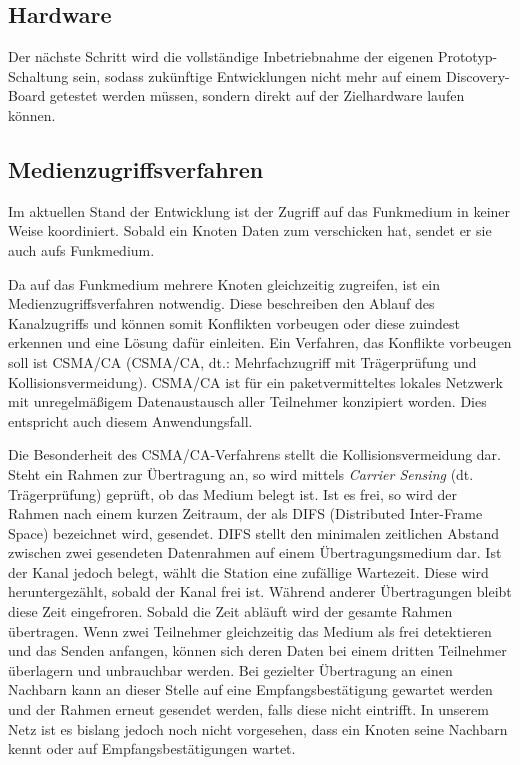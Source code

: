 \documentclass{IEEEtran}
\begin{document}
    \subsection{Hardware}
        Der nächste Schritt wird die vollständige Inbetriebnahme der eigenen
        Prototyp-Schaltung sein, sodass zukünftige Entwicklungen nicht mehr
        auf einem Discovery-Board getestet werden müssen, sondern direkt auf
        der Zielhardware laufen können.

    \subsection{Medienzugriffsverfahren}
    Im aktuellen Stand der Entwicklung ist der Zugriff auf das Funkmedium in 
    keiner Weise koordiniert. Sobald ein Knoten Daten zum verschicken hat, 
    sendet er sie auch aufs Funkmedium. 

    Da auf das Funkmedium mehrere Knoten gleichzeitig zugreifen, ist ein 
    Medienzugriffsverfahren notwendig. Diese beschreiben den Ablauf des 
    Kanalzugriffs und können somit Konflikten vorbeugen oder diese zuindest 
    erkennen und eine Lösung dafür einleiten. Ein Verfahren, das Konflikte 
    vorbeugen soll ist \acl{CSMA/CA} 
    (\acs{CSMA/CA}, dt.: Mehrfachzugriff mit Trägerprüfung und Kollisionsvermeidung). 
    \acs{CSMA/CA} ist für ein paketvermitteltes lokales Netzwerk mit unregelmäßigem 
    Datenaustausch aller Teilnehmer konzipiert worden. Dies entspricht auch 
    diesem Anwendungsfall.

    Die Besonderheit des \acs{CSMA/CA}-Verfahrens stellt die Kollisionsvermeidung dar. 
    Steht ein Rahmen zur Übertragung an, so wird mittels
    \emph{Carrier Sensing} (dt. Trägerprüfung) geprüft, ob das Medium belegt 
    ist. Ist es frei, so wird der Rahmen nach einem kurzen Zeitraum, der als 
    DIFS (Distributed Inter-Frame Space) bezeichnet wird, gesendet. DIFS stellt 
    den minimalen zeitlichen Abstand zwischen zwei gesendeten Datenrahmen auf 
    einem Übertragungsmedium dar. Ist der Kanal jedoch belegt, wählt die Station 
    eine zufällige Wartezeit. Diese wird heruntergezählt, sobald der Kanal frei 
    ist. Während anderer Übertragungen bleibt diese Zeit eingefroren. Sobald die 
    Zeit abläuft wird der gesamte Rahmen übertragen. 
    Wenn zwei Teilnehmer gleichzeitig das Medium als frei detektieren und das 
    Senden anfangen, können sich deren Daten bei einem dritten Teilnehmer 
    überlagern und unbrauchbar werden. Bei gezielter Übertragung an einen 
    Nachbarn kann an dieser Stelle auf eine Empfangsbestätigung gewartet werden 
    und der Rahmen erneut gesendet werden, falls diese nicht eintrifft. In 
    unserem Netz ist es bislang jedoch noch nicht vorgesehen, dass ein Knoten 
    seine Nachbarn kennt oder auf Empfangsbestätigungen wartet. 
\end{document}
